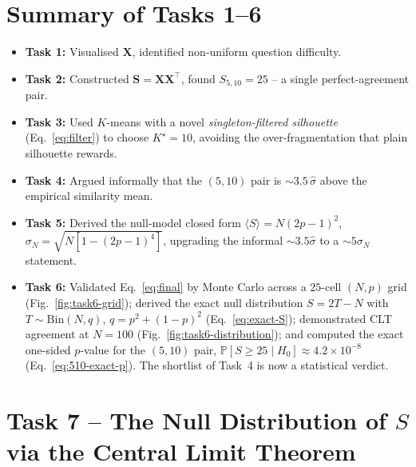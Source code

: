 \documentclass[11pt,a4paper]{article}
\newcommand{\X}{\bm{X}}
\newcommand{\Sm}{\bm{S}}
\renewcommand{\Pr}{\mathbb{P}}
\begin{document}
\section*{Summary of Tasks 1--6}
\begin{itemize}[leftmargin=2em]
  \item \textbf{Task 1:} Visualised $\X$, identified non-uniform question
        difficulty.
  \item \textbf{Task 2:} Constructed $\Sm = \X\X^{\!\top}$, found
        $S_{5,10}=25$ -- a single perfect-agreement pair.
  \item \textbf{Task 3:} Used $K$-means with a novel
        \emph{singleton-filtered silhouette} (Eq.~\eqref{eq:filter}) to
        choose $K^\star = 10$, avoiding the over-fragmentation that
        plain silhouette rewards.
  \item \textbf{Task 4:} Argued informally that the $(5,10)$ pair is
        $\sim 3.5\,\hat\sigma$ above the empirical similarity mean.
  \item \textbf{Task 5:} Derived the null-model closed form
        $\langle S\rangle = N(2p-1)^2$, $\sigma_N = \sqrt{N[1-(2p-1)^4]}$,
        upgrading the informal $\sim 3.5\hat\sigma$ to a $\sim 5\sigma_N$
        statement.
  \item \textbf{Task 6:} Validated Eq.~\eqref{eq:final} by Monte Carlo
        across a $25$-cell $(N,p)$ grid (Fig.~\ref{fig:task6-grid});
        derived the exact null distribution $S = 2T-N$ with
        $T \sim \mathrm{Bin}(N, q)$, $q = p^2+(1-p)^2$
        (Eq.~\eqref{eq:exact-S}); demonstrated CLT agreement at $N=100$
        (Fig.~\ref{fig:task6-distribution}); and computed the exact
        one-sided $p$-value for the $(5,10)$ pair,
        $\Pr[S \geq 25 \mid H_0] \approx 4.2 \times 10^{-8}$
        (Eq.~\eqref{eq:510-exact-p}). The shortlist of Task~4 is now a
        statistical verdict.
\end{itemize}

\section{Task 7 -- The Null Distribution of $S$ via the
                    Central Limit Theorem}
\end{document}
